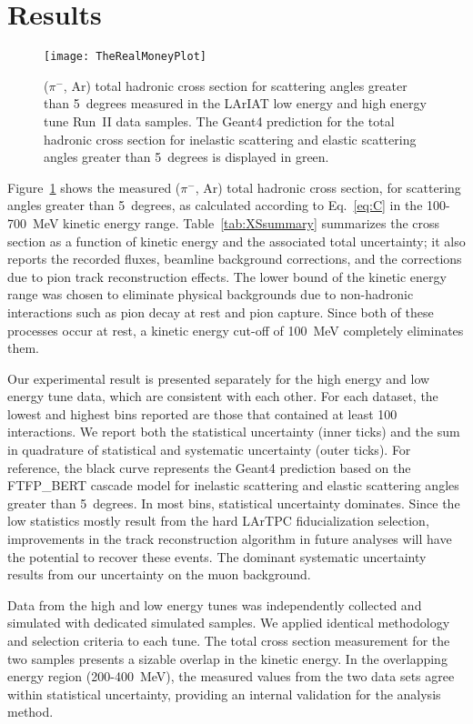 \documentclass[%
 floatfix,
 reprint,
 twocolumn,
superscriptaddress,
showpacs,preprintnumbers,
 amsmath,amssymb,
 aps,
prd,
]{revtex4-1}
\begin{document}
\section{\label{sec:Results0}Results}
\begin{figure}[b]
\texttt{[image: TheRealMoneyPlot]}
\caption{\label{fig:epsart} ($\pi^-$, Ar) total hadronic cross section for  scattering angles greater than 5~degrees measured in the LArIAT low energy and high energy tune Run~II data samples. The Geant4 prediction for the total hadronic cross section for inelastic scattering and elastic scattering angles greater than 5~degrees is displayed in green. }
\end{figure}


Figure~\ref{fig:epsart} shows the measured ($\pi^-$, Ar) total hadronic cross section,  for  scattering angles greater than 5~degrees, as calculated according to Eq.~\ref{eq:C} in the 100-700~MeV kinetic energy range. Table~\ref{tab:XSsummary} summarizes the cross section as a function of kinetic energy and  the associated total uncertainty; it also reports the recorded fluxes,  beamline background corrections, and the  corrections due to pion track reconstruction effects. The lower bound of the kinetic energy range was chosen to eliminate physical backgrounds due to non-hadronic interactions such as pion decay at rest and pion capture. Since both of these processes occur at rest, a kinetic energy cut-off of 100~MeV completely eliminates them. 





Our experimental result is presented separately for the high energy and low energy tune data, which are consistent with each other.  
For each dataset, the lowest and highest bins reported are those that contained at least 100 interactions. We report both the statistical uncertainty (inner ticks) and the sum in quadrature of statistical and systematic uncertainty (outer ticks). For reference, the black curve represents the Geant4 prediction based on the FTFP\_BERT cascade model  for inelastic scattering and elastic scattering angles greater than 5~degrees. 
In most bins,  statistical uncertainty dominates. Since the low statistics mostly result from the hard LArTPC fiducialization selection, improvements in the track reconstruction algorithm in future analyses will have the potential to recover these events.
The dominant systematic uncertainty results from our uncertainty on the muon background. 

Data from the high and low energy tunes was independently collected and simulated with dedicated simulated samples. We applied identical methodology and selection criteria to each tune. The total cross section measurement for the two samples presents a sizable overlap in the kinetic energy. In the overlapping energy region (200-400~MeV), the measured values from the two data sets agree within statistical uncertainty, providing an internal validation for the analysis method.
\end{document}
